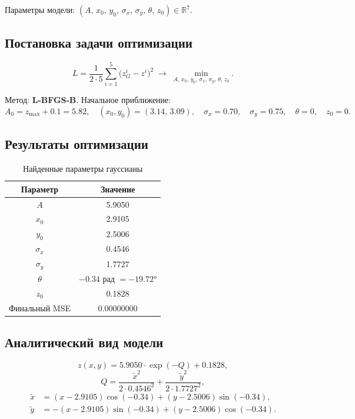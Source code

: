 \documentclass[12pt,a4paper]{article}
\begin{document}
Параметры модели: $(A,\, x_0,\, y_0,\, \sigma_x,\, \sigma_y,\, \theta,\, z_0) \in \mathbb{R}^7$.

\subsection{Постановка задачи оптимизации}

\begin{equation}
  L = \frac{1}{2 \cdot 5}\sum_{i=1}^{5}\bigl(z_G^i - z^i\bigr)^2
  \;\longrightarrow\; \min_{A,\, x_0,\, y_0,\, \sigma_x,\, \sigma_y,\, \theta,\, z_0}.
\end{equation}

Метод: \textbf{L-BFGS-B}. Начальное приближение:
\[
  A_0 = z_{\max} + 0.1 = 5.82, \quad
  (x_0, y_0) = (3.14,\, 3.09), \quad
  \sigma_x = 0.70,\quad \sigma_y = 0.75, \quad
  \theta = 0, \quad z_0 = 0.
\]

\subsection{Результаты оптимизации}

\begin{table}[H]
\centering
\caption{Найденные параметры гауссианы}
\begin{tabular}{cc}
\toprule
Параметр & Значение \\
\midrule
$A$        & 5.9050 \\
$x_0$      & 2.9105 \\
$y_0$      & 2.5006 \\
$\sigma_x$ & 0.4546 \\
$\sigma_y$ & 1.7727 \\
$\theta$   & $-0.34$ рад $= -19.72°$ \\
$z_0$      & 0.1828 \\
Финальный MSE & 0.00000000 \\
\bottomrule
\end{tabular}
\end{table}

\subsection{Аналитический вид модели}

\begin{equation}
  z(x,y) = 5.9050\cdot\exp(-Q) + 0.1828,
\end{equation}
\begin{equation}
  Q = \frac{\tilde{x}^2}{2\cdot 0.4546^2} + \frac{\tilde{y}^2}{2\cdot 1.7727^2},
\end{equation}
\begin{align}
  \tilde{x} &= (x - 2.9105)\cos(-0.34) + (y - 2.5006)\sin(-0.34), \\
  \tilde{y} &= -(x - 2.9105)\sin(-0.34) + (y - 2.5006)\cos(-0.34).
\end{align}
\end{document}
